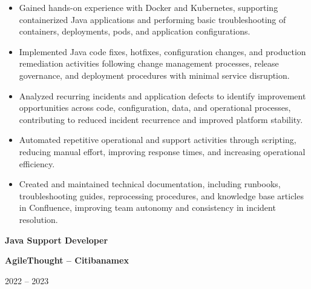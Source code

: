 \documentclass[10pt,letterpaper]{article}
\newcommand{\jobtitle}[1]{
    {\bfseries #1}
}
\newcommand{\company}[1]{
    {\bfseries\color{DarkGray} #1}
}
\newcommand{\jobdate}[1]{
    {\color{MediumGray} #1}
}
\begin{document}
\begin{itemize}
    \item Gained hands-on experience with Docker and Kubernetes, supporting containerized Java applications and performing basic troubleshooting of containers, deployments, pods, and application configurations.

    \item Implemented Java code fixes, hotfixes, configuration changes, and production remediation activities following change management processes, release governance, and deployment procedures with minimal service disruption.

    \item Analyzed recurring incidents and application defects to identify improvement opportunities across code, configuration, data, and operational processes, contributing to reduced incident recurrence and improved platform stability.

    \item Automated repetitive operational and support activities through scripting, reducing manual effort, improving response times, and increasing operational efficiency.

    \item Created and maintained technical documentation, including runbooks, troubleshooting guides, reprocessing procedures, and knowledge base articles in Confluence, improving team autonomy and consistency in incident resolution.

\end{itemize}


\jobtitle{Java Support Developer} \textbar{}
\company{AgileThought -- Citibanamex}
\hfill \textbar{}
\jobdate{2022 -- 2023}
\end{document}
